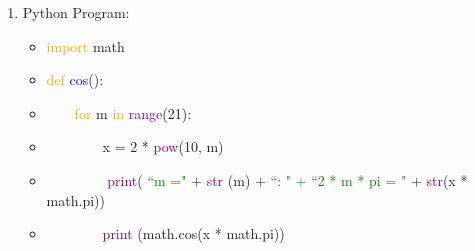 \documentclass{article}
\begin{document}
\begin{enumerate}
\begin{enumerate}
\begin{itemize} [label={}]
			 \item $0.5 = (0.1+0.1+0.1+0.1+0.1)_2 = 1.0000 \ 0000 \ ...00_{52}0_{53} \times 2^{-1}$
			 \item Hence, the first loop print out 5 numbers. 	
			\end{itemize}
			For the second loop we have:
			\begin{itemize} [label={}]
			 \item $1.1_2 =  1.0 \ \overline{0011}$; hence, in IEEE representation for double,
			 \item $1.1 = 1.0 \ 0011...\ 0011 \ 01_{52} 0_{53} \times 2^{0}$
			 \item $1.2 = (1.1+0.1)= 1.0 \ 0110 \ 0110 ... \ 0110 \ 10_{52}0_{53} \times 2^{0}$
			 \item $1.3 = (1.1 + 0.1+0.1) = 1. 0 \ 1001 \ 1001 ... \ 1001 \ 1 1_{52}0_{53} \times 2^{0}$
			 \item $1.4 = (1.1+0.1+0.1+0.1) = 1. 0 \ 1100 \ 1100 ... 1100\ 1101 \ 00_{52}0_{53} \times 2^{0}$
			 \item $1.5 = (1.1+0.1+0.1+0.1+0.1)_2 = 1.10000000...01_{52}0_{53} \times 2^{0}$
			 \item Hence, we get $1.5_2$'s IEEE representation is bigger than $1.5$; therefore, only 4 numbers are printed out. 
			\end{itemize}			
		\item I would recommend the second expression which is $\frac{x}{10.0}$, since from the previous question we 
		knew that computer cannot represent $0.1$ in a exact form in binary. However, it could represent $10.0$ in exact form as $1010 = 1.01 \times 2^3$. 
	\end{enumerate}
\item  Python Program:
	\begin{itemize} [label={}]
	\item \textcolor{orange} {import} math
	\item   \textcolor{orange} {def} \textcolor{blue}{cos}():
	\item \ \ \  \ \textcolor{orange} {for} m \textcolor{orange} {in} \textcolor{purple} {range}(21): 
	\item \ \ \ \ \ \  \ \ x = 2 * \textcolor{purple}{pow}(10, m)
	\item \ \ \ \ \ \ \ \ \textcolor{purple}{ print}( \textcolor{green}{``m ="} + \textcolor{purple}{str} (m) + 
		\textcolor{green} {``: "  +  ``2 * m * pi = "}  +  \textcolor{purple}{str}(x * math.pi))
	\item \ \ \ \ \ \ \ \  \textcolor{purple}{print} (math.cos(x * math.pi))

\end{itemize}
\end{enumerate}
\end{document}

